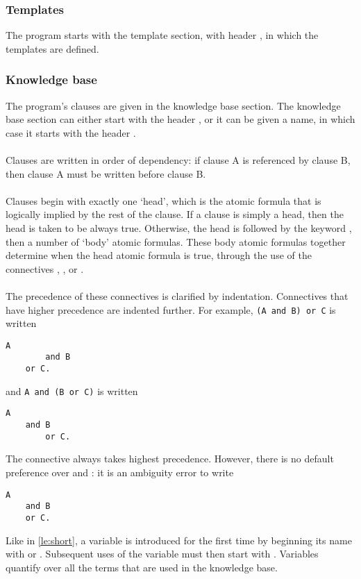 \documentclass[../main.tex]{subfiles}
\begin{document}
\subsubsection{Templates}
The program starts with the template section, with header , in which the templates are defined. 

\subsubsection{Knowledge base}
The program's clauses are given in the knowledge base section. The knowledge base section can either start with the header , or it can be given a name, in which case it starts with the header . 
\\
\\
Clauses are written in order of dependency: if clause A is referenced by clause B, then clause A must be written before clause B.
\\ 
\\
Clauses begin with exactly one `head', which is the atomic formula that is logically implied by the rest of the clause. If a clause is simply a head, then the head is taken to be always true. Otherwise, the head is followed by the keyword , then a number of `body' atomic formulas. These body atomic formulas together determine when the head atomic formula is true, through the use of the connectives , , or .
\\ 
\\
The precedence of these connectives is clarified by indentation. Connectives that have higher precedence are indented further. For example, \texttt{(A and B) or C} is written
\begin{lstlisting}[language={LE}]
    A
        and B
    or C.
\end{lstlisting}
and \texttt{A and (B or C)} is written
\begin{lstlisting}[language={LE}]
    A
    and B
        or C.
\end{lstlisting}
The connective  always takes highest precedence. However, there is no default preference over  and : it is an ambiguity error to write
\begin{lstlisting}[language={LE}]
    A 
    and B
    or C.
\end{lstlisting}
Like in \ref{le:short}, a variable is introduced for the first time by beginning its name with  or .  Subsequent uses of the variable must then start with . Variables quantify over all the terms that are used in the knowledge base.
\end{document}
